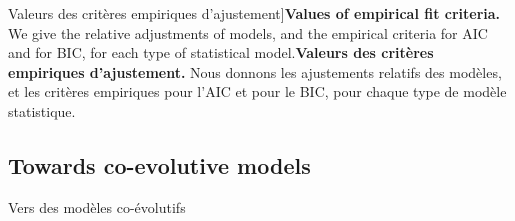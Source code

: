 \begin{table}[ht]
\caption[Values of empirical fit criteria][Valeurs des critères empiriques d'ajustement]{\textbf{Values of empirical fit criteria.} We give the relative adjustments of models, and the empirical criteria for AIC and for BIC, for each type of statistical model.\label{tab:interactiongibrat:empiricalaic}}{\textbf{Valeurs des critères empiriques d'ajustement.} Nous donnons les ajustements relatifs des modèles, et les critères empiriques pour l'AIC et pour le BIC, pour chaque type de modèle statistique.\label{tab:interactiongibrat:empiricalaic}}
\end{table}







\subsection{Towards co-evolutive models}{Vers des modèles co-évolutifs}


